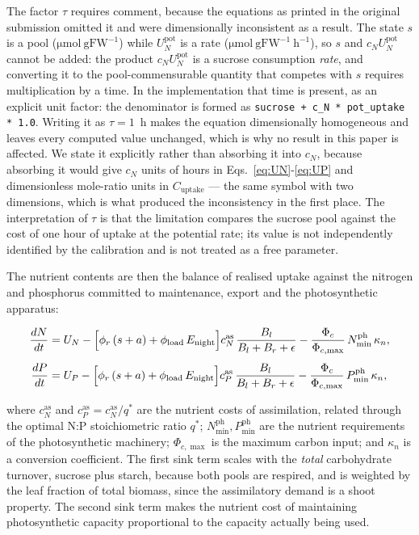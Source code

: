 \documentclass[a4paper,fleqn]{cas-sc}
\begin{document}
The factor $\tau$ requires comment, because the equations as printed in the
original submission omitted it and were dimensionally inconsistent as a
result. The state $s$ is a pool
($\mathrm{\mu mol\ gFW^{-1}}$) while $U_N^{\text{pot}}$ is a rate
($\mathrm{\mu mol\ gFW^{-1}\ h^{-1}}$), so $s$ and $c_N U_N^{\text{pot}}$
cannot be added: the product $c_N U_N^{\text{pot}}$ is a sucrose consumption
\emph{rate}, and converting it to the pool-commensurable quantity that
competes with $s$ requires multiplication by a time. In the implementation
that time is present, as an explicit unit factor: the denominator is formed as
\texttt{sucrose + c\_N * pot\_uptake * 1.0}. Writing it as $\tau = 1$~h makes
the equation dimensionally homogeneous and leaves every computed value
unchanged, which is why no result in this paper is affected. We state it
explicitly rather than absorbing it into $c_N$, because absorbing it would
give $c_N$ units of hours in Eqs.~\eqref{eq:UN}-\eqref{eq:UP} and
dimensionless mole-ratio units in $C_{\text{uptake}}$ --- the same symbol with
two dimensions, which is what produced the inconsistency in the first place.
The interpretation of $\tau$ is that the limitation compares the sucrose pool
against the cost of one hour of uptake at the potential rate; its value is not
independently identified by the calibration and is not treated as a free
parameter.

The nutrient contents are then the balance of realised uptake against the
nitrogen and phosphorus committed to maintenance, export and the
photosynthetic apparatus:

\begin{align}
\frac{dN}{dt} &=
U_N
- \Bigl[\phi_r\,(s + a) + \phi_{\text{load}}\,E_{\text{night}}\Bigr]
  c_N^{\text{as}}\,\frac{B_l}{B_l+B_r+\epsilon}
- \frac{\Phi_c}{\Phi_{c,\max}}\,N_{\min}^{\text{ph}}\,\kappa_n,
\label{eq:dN}\\[4pt]
\frac{dP}{dt} &=
U_P
- \Bigl[\phi_r\,(s + a) + \phi_{\text{load}}\,E_{\text{night}}\Bigr]
  c_P^{\text{as}}\,\frac{B_l}{B_l+B_r+\epsilon}
- \frac{\Phi_c}{\Phi_{c,\max}}\,P_{\min}^{\text{ph}}\,\kappa_n,
\label{eq:dP}
\end{align}

where $c_N^{\text{as}}$ and $c_P^{\text{as}} = c_N^{\text{as}}/q^{*}$ are
the nutrient costs of assimilation, related through the optimal N:P
stoichiometric ratio $q^{*}$; $N_{\min}^{\text{ph}},P_{\min}^{\text{ph}}$
are the nutrient requirements of the photosynthetic machinery;
$\Phi_{c,\max}$ is the maximum carbon input; and $\kappa_n$ is a conversion
coefficient. The first sink term scales with the \emph{total} carbohydrate
turnover, sucrose plus starch, because both pools are respired, and is
weighted by the leaf fraction of total biomass, since the assimilatory
demand is a shoot property. The second sink term makes the nutrient cost of
maintaining photosynthetic capacity proportional to the capacity actually
being used.
\end{document}
